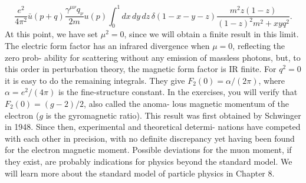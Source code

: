 \begin{equation}
  \frac{e^2}{4\pi^2}\bar u(p+q)\frac{\gamma^{\mu\nu}q_\nu}{2m}u(p)
  \int_0^1dx\,dy\,dz\,\delta(1-x-y-z)
  \frac{m^2z(1-z)}{(1-z)^2m^2+xyq^2}.
  \label{eq:6.18}
\end{equation}
At this point, we have set $\mu^2=0$, since we will obtain a finite result in this limit. The
electric form factor has an infrared divergence when $\mu=0$, reflecting the zero prob-
ability for scattering without any emission of massless photons, but, to this order in
perturbation theory, the magnetic form factor is IR finite. For $q^2=0$ it is easy to do the
remaining integrals. They give $F_2(0)=\alpha/(2\pi)$, where $\alpha=e^2/(4\pi)$ is the fine-structure
constant. In the exercises, you will verify that $F_2(0)=(g-2)/2$, also called the anoma-
lous magnetic momentum of the electron ($g$ is the gyromagnetic ratio). This result was
first obtained by Schwinger in 1948. Since then, experimental and theoretical determi-
nations have competed with each other in precision, with no definite discrepancy yet
having been found for the electron magnetic moment. Possible deviations for the muon
moment, if they exist, are probably indications for physics beyond the standard model.
We will learn more about the standard model of particle physics in Chapter 8.

